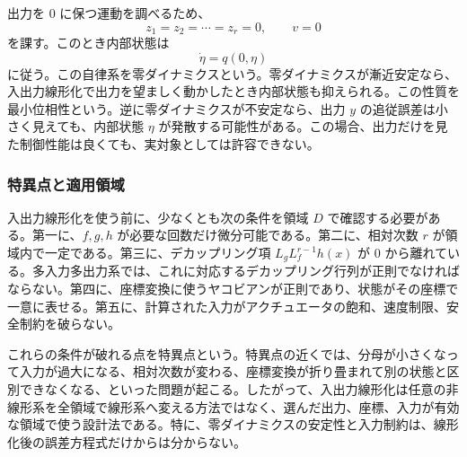 出力を 0 に保つ運動を調べるため、
\begin{equation}
  z_1=z_2=\cdots=z_r=0,\qquad v=0
\end{equation}
を課す。このとき内部状態は
\begin{equation}
  \dot{\eta}=q(0,\eta)
\end{equation}
に従う。この自律系を零ダイナミクスという。零ダイナミクスが漸近安定なら、入出力線形化で出力を望ましく動かしたとき内部状態も抑えられる。この性質を最小位相性という。逆に零ダイナミクスが不安定なら、出力 $y$ の追従誤差は小さく見えても、内部状態 $\eta$ が発散する可能性がある。この場合、出力だけを見た制御性能は良くても、実対象としては許容できない。

\subsubsection{特異点と適用領域}

入出力線形化を使う前に、少なくとも次の条件を領域 $D$ で確認する必要がある。第一に、$f,g,h$ が必要な回数だけ微分可能である。第二に、相対次数 $r$ が領域内で一定である。第三に、デカップリング項 $L_gL_f^{r-1}h(x)$ が 0 から離れている。多入力多出力系では、これに対応するデカップリング行列が正則でなければならない。第四に、座標変換に使うヤコビアンが正則であり、状態がその座標で一意に表せる。第五に、計算された入力がアクチュエータの飽和、速度制限、安全制約を破らない。

これらの条件が破れる点を特異点という。特異点の近くでは、分母が小さくなって入力が過大になる、相対次数が変わる、座標変換が折り畳まれて別の状態と区別できなくなる、といった問題が起こる。したがって、入出力線形化は任意の非線形系を全領域で線形系へ変える方法ではなく、選んだ出力、座標、入力が有効な領域で使う設計法である。特に、零ダイナミクスの安定性と入力制約は、線形化後の誤差方程式だけからは分からない。

